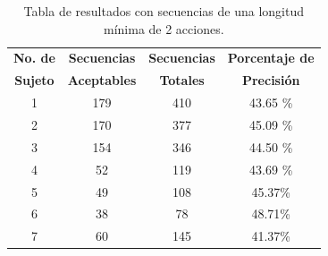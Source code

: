 \begin{table}[]
\centering
\begin{tabular}{cccc}
\hline
\textbf{No. de }	
&	\textbf{Secuencias }	
&   \textbf{Secuencias }	
&	\textbf{Porcentaje de }	\\

\textbf{Sujeto}
&	\textbf{Aceptables}
&	\textbf{Totales}
&	\textbf{Precisi\'on}
	\\ \hline

1
&	179
&	410
&	43.65 \%		\\
	
2
&	170
&	377
&	45.09 \%		\\

3
&	154
&	346
&	44.50 \%		\\

4
&	52
&	119
&	43.69 \%		\\

5
&	49
&	108
&	45.37\%			\\

6
&	38
&	78
&	48.71\%			\\

7
&	60
&	145
&	41.37\%			\\
\hline
\end{tabular}
\caption{Tabla de resultados con secuencias de una longitud m\'inima de 
 2 acciones.}
\label{tableRes2}
\end{table}

